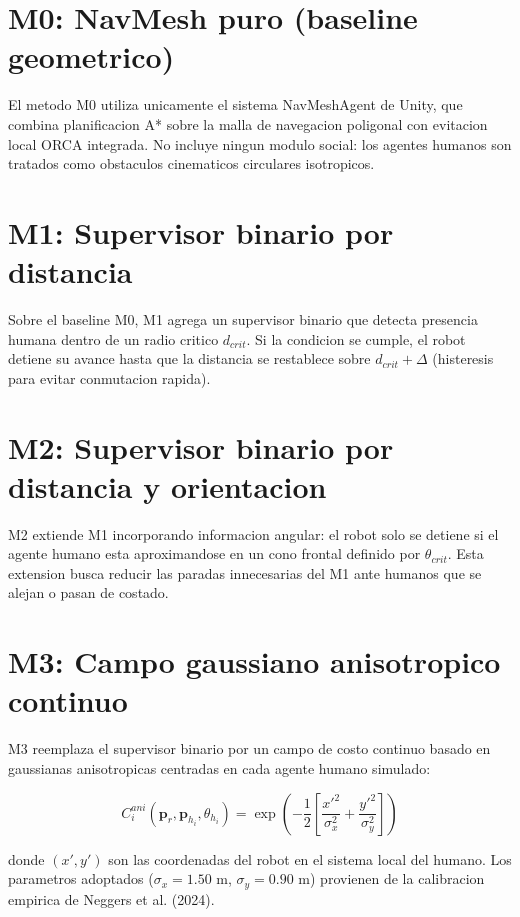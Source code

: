 \documentclass[12pt,a4paper,oneside]{book}
\begin{document}
\section{M0: NavMesh puro (baseline geometrico)}

El metodo M0 utiliza unicamente el sistema NavMeshAgent de Unity, que combina planificacion A* sobre la malla de navegacion poligonal con evitacion local ORCA integrada. No incluye ningun modulo social: los agentes humanos son tratados como obstaculos cinematicos circulares isotropicos.

\section{M1: Supervisor binario por distancia}

Sobre el baseline M0, M1 agrega un supervisor binario que detecta presencia humana dentro de un radio critico $d_{crit}$. Si la condicion se cumple, el robot detiene su avance hasta que la distancia se restablece sobre $d_{crit} + \Delta$ (histeresis para evitar conmutacion rapida).

\section{M2: Supervisor binario por distancia y orientacion}

M2 extiende M1 incorporando informacion angular: el robot solo se detiene si el agente humano esta aproximandose en un cono frontal definido por $\theta_{crit}$. Esta extension busca reducir las paradas innecesarias del M1 ante humanos que se alejan o pasan de costado.

\section{M3: Campo gaussiano anisotropico continuo}

M3 reemplaza el supervisor binario por un campo de costo continuo basado en gaussianas anisotropicas centradas en cada agente humano simulado:

\begin{equation}
C_i^{ani}(\mathbf{p}_r, \mathbf{p}_{h_i}, \theta_{h_i}) = \exp\left(-\frac{1}{2}\left[\frac{x'^2}{\sigma_x^2} + \frac{y'^2}{\sigma_y^2}\right]\right)
\end{equation}

donde $(x', y')$ son las coordenadas del robot en el sistema local del humano. Los parametros adoptados ($\sigma_x = 1.50$ m, $\sigma_y = 0.90$ m) provienen de la calibracion empirica de Neggers et al. (2024).
\end{document}
